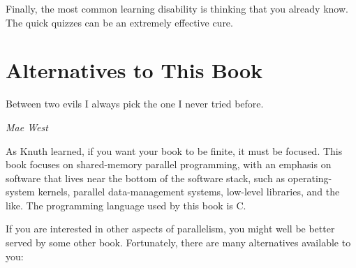 Finally, the most common learning disability is thinking that
you already know.
The quick quizzes can be an extremely effective cure.

\section{Alternatives to This Book}
\label{sec:Alternatives to This Book}
%
\epigraph{Between two evils I always pick the one I never tried before.}
	 {\emph{Mae West}}

As Knuth learned, if you want your book to be finite, it must be focused.
This book focuses on shared-memory parallel programming, with an
emphasis on software that lives near the bottom of the software stack,
such as operating-system kernels, parallel data-management systems,
low-level libraries, and the like.
The programming language used by this book is C.

If you are interested in other aspects of parallelism, you might well
be better served by some other book.
Fortunately, there are many alternatives available to you:

